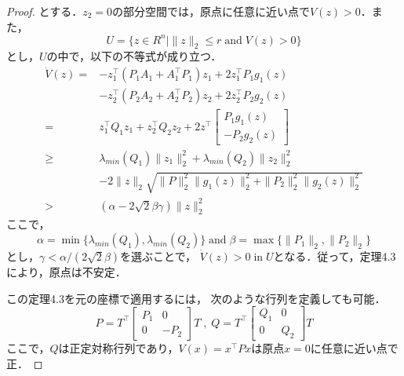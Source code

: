 \documentclass{jsarticle}
\begin{document}
\begin{proof}
  
  とする．$z_2 = 0$の部分空間では，原点に任意に近い点で$V(z) > 0$．また，
  \begin{equation*}
    U = \{z\in R^n \mid \|z\|_2\leq r \;\text{and}\; V(z)>0 \}
  \end{equation*}
  とし，$U$の中で，以下の不等式が成り立つ．
  \begin{align*}
    \dot V(z) =& -z_1^\top (P_1A_1 + A_1^\top P_1)z_1 + 2z_1^\top P_1g_1(z)\\
    &-z_2^\top (P_2A_2 + A_2^\top P_2)z_2 + 2z_2^\top P_2g_2(z)\\
    = & z_1^\top Q_1z_1 + z_2^\top Q_2 z_2 + 2z^\top \begin{bmatrix}
      P_1g_1(z)\\ -P_2g_2(z)
    \end{bmatrix}\\
    \geq &\lambda_{min}(Q_1)\|z_1\|^2_2 + \lambda_{min}(Q_2)\|z_2\|_2^2\\
    & -2\|z\|_2 \sqrt{ \|P\|^2_2 \|g_1(z)\|^2_2 + \|P_2\|^2_2\|g_2(z)\|^2_2 }\\
    > & (\alpha -2 \sqrt{2}\beta \gamma)\|z\|^2_2
  \end{align*}
  ここで，
  \begin{equation*}
    \alpha = \min \{\lambda_{min}(Q_1),\lambda_{min}(Q_2)\} \;\text{and}\; \beta = \max\{\|P_1\|_2,\|P_2\|_2\}
  \end{equation*}
  とし，$\gamma < \alpha/(2\sqrt{2} \beta)$を選ぶことで，
  $\dot V(z) > 0 \;\text{in}\; U$となる．従って，定理4.3により，原点は不安定．

  この定理4.3を元の座標で適用するには，
  次のような行列を定義しても可能．
  \begin{equation*}
    P = T^\top \begin{bmatrix}
      P_1 & 0\\ 0& -P_2
    \end{bmatrix}T\;,\;
    Q = T^\top \begin{bmatrix}
      Q_1 & 0\\ 0 & Q_2
    \end{bmatrix}T
  \end{equation*}
ここで，$Q$は正定対称行列であり，$V(x) = x^\top Px$は原点$x = 0$に任意に近い点で正．
  

\end{proof}
\end{document}
